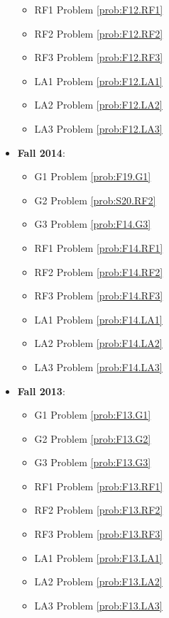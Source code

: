 \documentclass{article}
\theoremstyle{definition}
\begin{document}
\begin{itemize}
\begin{itemize}
	\item RF1 Problem \ref{prob:F12.RF1}
	\item RF2 Problem \ref{prob:F12.RF2}
	\item RF3 Problem \ref{prob:F12.RF3}
	\item LA1 Problem \ref{prob:F12.LA1}
	\item LA2 Problem \ref{prob:F12.LA2}
	\item LA3 Problem \ref{prob:F12.LA3}	
	\end{itemize}	
	\item \textbf{Fall 2014}:  
	\begin{itemize}
	\item G1 Problem \ref{prob:F19.G1} 
	\item G2 Problem \ref{prob:S20.RF2} 
	\item G3 Problem \ref{prob:F14.G3}
	\item RF1 Problem \ref{prob:F14.RF1}
	\item RF2 Problem \ref{prob:F14.RF2}
	\item RF3 Problem \ref{prob:F14.RF3}
	\item LA1 Problem \ref{prob:F14.LA1}
	\item LA2 Problem \ref{prob:F14.LA2}
	\item LA3 Problem \ref{prob:F14.LA3}
	\end{itemize}
	\item \textbf{Fall 2013}:  
	\begin{itemize}
	\item G1 Problem \ref{prob:F13.G1} 
	\item G2 Problem \ref{prob:F13.G2} 
	\item G3 Problem \ref{prob:F13.G3}
	\item RF1 Problem \ref{prob:F13.RF1}
	\item RF2 Problem \ref{prob:F13.RF2}
	\item RF3 Problem \ref{prob:F13.RF3}
	\item LA1 Problem \ref{prob:F13.LA1}
	\item LA2 Problem \ref{prob:F13.LA2}
	\item LA3 Problem \ref{prob:F13.LA3}
	\end{itemize}


\end{itemize}
\end{document}
